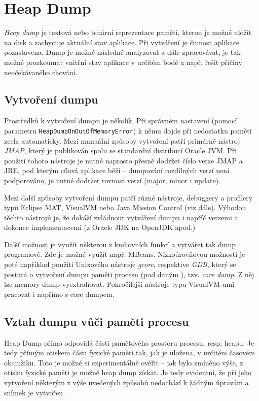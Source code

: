 \section{Heap Dump}
\textit{Heap dump} je textová nebo binární reprezentace paměti, kterou je možné uložit na disk a zachycuje aktuální stav aplikace. Při vytváření je činnost aplikace pozastavena. Dump je možné následně analyzovat a dále zpracovávat, je tak možné prozkoumat vnitřní stav aplikace v určitém bodě a např. řešit příčiny neočekávaného chování. 

\subsection{Vytvoření dumpu}
Prostředků k vytvoření dumpu je několik. Při správném nastavení (pomocí parametru \texttt{HeapDumpOnOutOfMemoryError}) k němu dojde při nedostatku paměti zcela automaticky. Mezi manuální způsoby vytvoření patří primárně nástroj \textit{JMAP}, který je publikován spolu se standardní distribucí Oracle JVM. Při použití tohoto nástroje je nutné naprosto přesně dodržet číslo verze JMAP a JRE, pod kterým cílová aplikace běží – dumpování rozdílných verzí není podporováno, je nutné dodržet rovnost verzí (major, minor i update).

Mezi další způsoby vytvoření dumpu patří různé nástroje, debuggery a profilery typu Eclipse MAT, VisualVM nebo Java Mission Control (viz dále). Výhodou těchto nástrojů je, že dokáží zvládnout vytváření dumpu i napříč verzemi a dokonce implementacemi (z Oracle JDK na OpenJDK apod.)

Další možnost je využít některou z knihovních funkcí a vytvářet tak dump programově. Zde je možné využít např. MBeans. Nízkoúrovňovou možností je poté například použití Unixového nástroje \textit{gcore}, respektive \textit{GDB}, který se postará o vytvoření dumpu paměti procesu (pod daným ), tzv. \textit{core dump}. Z něj lze memory dump vyextrahovat. Pokročilejší nástroje typu VisualVM umí pracovat i napřímo s core dumpem.

\subsection{Vztah dumpu vůči paměti procesu}
Heap Dump přímo odpovídá části paměťového prostoru procesu, resp. heapu. Je tedy přímým otiskem části fyzické paměti tak, jak je uložena, v určitém časovém okamžiku. Toto je možné si experimentálně ověřit -- jak bylo zmíněno výše, z otisku fyzické paměti je možné heap dump získat. Je tedy evidentní, že při jeho vytvoření některým z výše uvedených způsobů nedochází k žádným úpravám a snímek je vytvořen . 

